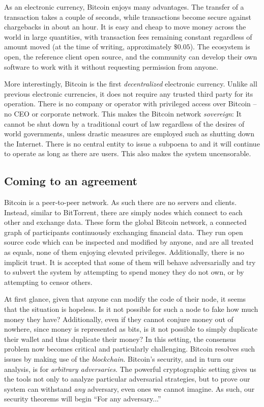 As an electronic currency, Bitcoin enjoys many advantages. The transfer of
a transaction takes a couple of seconds, while transactions become secure
against chargebacks in about an hour. It is easy and cheap to move money across
the world in large quantities, with transaction fees remaining constant
regardless of amount moved (at the time of writing, approximately $\$0.05$). The
ecosystem is open, the reference client open source, and the community can
develop their own software to work with it without requesting permission from
anyone.

More interestingly, Bitcoin is the first \emph{decentralized} electronic
currency. Unlike all previous electronic currencies, it does not require any
trusted third party for its operation. There is no company or operator with
privileged access over Bitcoin -- no CEO or corporate network. This makes
the Bitcoin network \emph{sovereign}: It cannot be shut down by a traditional
court of law regardless of the desires of world governments, unless drastic
measures are employed such as shutting down the Internet. There is no central
entity to issue a subpoena to and it will continue to operate as long as there
are users. This also makes the system uncensorable.

\subsection{Coming to an agreement}
Bitcoin is a peer-to-peer network. As such there are no servers and clients.
Instead, similar to BitTorrent, there are simply nodes which connect to each
other and exchange data. These form the global Bitcoin network, a connected
graph of participants continuously exchanging financial data. They run open
source code which can be inspected and modified by anyone, and are all
treated as equals, none of them enjoying elevated privileges. Additionally, there
is no implicit trust. It is accepted that some of them will behave adversarially
and try to subvert the system by attempting to spend money they do not own,
or by attempting to censor others.

At first glance, given that anyone can modify the code of their node, it seems
that the situation is hopeless. Is it not possible for such a node to fake how
much money they have? Additionally, even if they cannot conjure money out of
nowhere, since money is represented as bits, is it not possible to simply
duplicate their wallet and thus duplicate their money? In this setting, the
consensus problem now becomes critical and particularly challenging. Bitcoin
resolves such issues by making use of the \emph{blockchain}.
Bitcoin's security, and in turn our analysis, is for \emph{arbitrary
adversaries}. The powerful cryptographic setting gives us the tools not only to
analyze particular adversarial strategies, but to prove our system can withstand
\emph{any} adversary, even ones we cannot imagine. As such, our security
theorems will begin ``For any adversary...''

